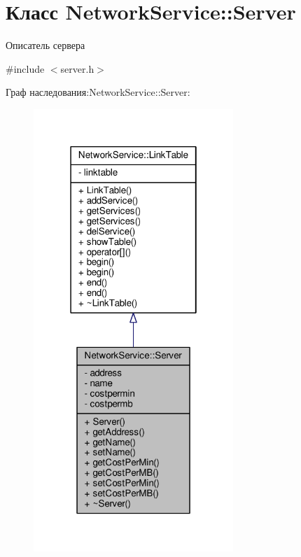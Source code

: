 \hypertarget{class_network_service_1_1_server}{}\section{Класс Network\+Service\+:\+:Server}
\label{class_network_service_1_1_server}


Описатель сервера  




{\ttfamily \#include $<$server.\+h$>$}



Граф наследования\+:Network\+Service\+:\+:Server\+:\nopagebreak
\begin{figure}[H]
\begin{center}
\leavevmode
\includegraphics[width=214pt]{class_network_service_1_1_server__inherit__graph}
\end{center}
\end{figure}


